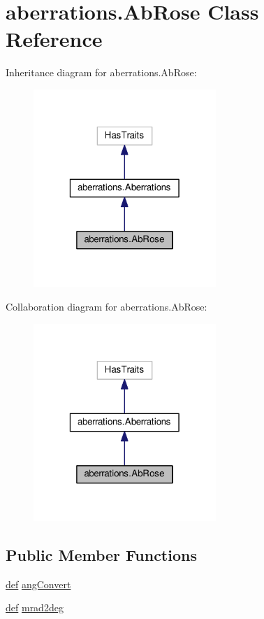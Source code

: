 \hypertarget{classaberrations_1_1_ab_rose}{\section{aberrations.\-Ab\-Rose Class Reference}
\label{classaberrations_1_1_ab_rose}
}


Inheritance diagram for aberrations.\-Ab\-Rose\-:
\nopagebreak
\begin{figure}[H]
\begin{center}
\leavevmode
\includegraphics[width=196pt]{classaberrations_1_1_ab_rose__inherit__graph}
\end{center}
\end{figure}


Collaboration diagram for aberrations.\-Ab\-Rose\-:
\nopagebreak
\begin{figure}[H]
\begin{center}
\leavevmode
\includegraphics[width=196pt]{classaberrations_1_1_ab_rose__coll__graph}
\end{center}
\end{figure}
\subsection*{Public Member Functions}
\begin{DoxyCompactItemize}
\item 
\hyperlink{sim_image_from_wave_8m_a72b6b8e83430abf007f20aeae4dc2f74}{def} \hyperlink{classaberrations_1_1_ab_rose_a0e5d7438c77b1b0525cbfae74d0fa913}{ang\-Convert}
\item 
\hyperlink{sim_image_from_wave_8m_a72b6b8e83430abf007f20aeae4dc2f74}{def} \hyperlink{classaberrations_1_1_ab_rose_a8f584ac5623dd65e1b901746e26fa68b}{mrad2deg}
\end{DoxyCompactItemize}
